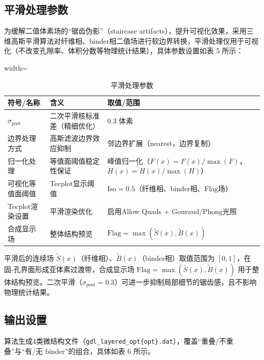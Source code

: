 \subsection{平滑处理参数}
为缓解二值体素场的“锯齿伪影”（staircase artifacts），提升可视化效果，采用三维高斯平滑算法对纤维相、binder相二值场进行软边界转换，平滑处理仅用于可视化（不改变孔隙率、体积分数等物理统计结果），具体参数设置如表 5 所示：

\begin{table}[H]
\centering
\begingroup
\small
\setlength{\tabcolsep}{6pt}
\renewcommand{\arraystretch}{1.15}
\begin{adjustbox}{width=\columnwidth}
\begin{tabular}{p{2.2cm}p{3.0cm}p{3.2cm}}
\toprule
符号/名称 & 含义 & 取值/范围 \\
\midrule
$\sigma_{\text{post}}$ & 二次平滑核标准差（精细优化） & $0.3$ 体素 \\
边界处理方式 & 高斯滤波边界效应抑制 & 邻边界扩展（nearest，边界复制） \\
归一化处理 & 等值面阈值稳定性保证 & 峰值归一化（$F(x) = F(x)/\max(F)$，$H(x) = H(x)/\max(H)$） \\
可视化等值面阈值 & Tecplot显示阈值 & $\text{Iso} = 0.5$（纤维相、binder相、Flag场） \\
Tecplot渲染设置 & 平滑渲染优化 & 启用Allow Quads + Gouraud/Phong光照 \\
合成显示场 & 整体结构预览 & $\text{Flag} = \max(\tilde{S}(x), \tilde{B}(x))$ \\
\bottomrule
\end{tabular}
\end{adjustbox}
\endgroup
\caption{平滑处理参数}
\label{tab:smoothing_params}
\end{table}

平滑后的连续场 $\tilde{S}(x)$（纤维相）、$\tilde{B}(x)$（binder相）取值范围为 $[0,1]$，在固-孔界面形成亚体素过渡带，合成显示场 $\text{Flag} = \max(\tilde{S}(x), \tilde{B}(x))$ 用于整体结构预览。二次平滑（$\sigma_{\text{post}} = 0.3$）可进一步抑制局部细节的锯齿感，且不影响物理统计结果。

\subsection{输出设置}
{\raggedright
\hspace{2em}算法生成4类微结构文件（\texttt{gdl\_layered\-\_opt\-\{opt\}.dat}），覆盖“重叠/不重叠”与“有/无 binder”的组合，具体如表 6 所示。
\par}

